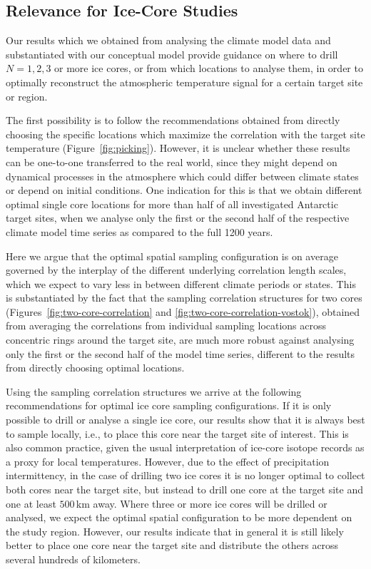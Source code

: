 \documentclass[draft]{agujournal2019}
\begin{document}
\subsection{Relevance for Ice-Core Studies}
\label{discussion:relevance}

Our results which we obtained from analysing the climate model data and
substantiated with our conceptual model provide guidance on where to drill
$N=1, 2, 3$ or more ice cores, or from which locations to analyse them, in order
to optimally reconstruct the atmospheric temperature signal for a certain target
site or region.

The first possibility is to follow the recommendations obtained from directly
choosing the specific locations which maximize the correlation with the target
site temperature (Figure~\ref{fig:picking}). However, it is unclear whether these
results can be one-to-one transferred to the real world, since they might depend
on dynamical processes in the atmosphere which could differ between climate
states or depend on initial conditions. One indication for this is that we
obtain different optimal single core locations for more than half of all
investigated Antarctic target sites, when we analyse only the first or the
second half of the respective climate model time series as compared to the full
1200 years.

Here we argue that the optimal spatial sampling configuration is on average
governed by the interplay of the different underlying correlation length scales,
which we expect to vary less in between different climate periods or states.
This is substantiated by the fact that the sampling correlation structures for
two cores (Figures~\ref{fig:two-core-correlation} and
\ref{fig:two-core-correlation-vostok}), obtained from averaging the correlations
from individual sampling locations  across concentric rings around the target
site, are much more robust against analysing only the first or the second half
of the model time series, different to the results from directly choosing
optimal locations.

Using the sampling correlation structures we arrive at the following
recommendations for optimal ice core sampling configurations. If it is only
possible to drill or analyse a single ice core, our results show that it is
always best to sample locally, i.e., to place this core near the target site of
interest. This is also common practice, given the usual interpretation of
ice-core isotope records as a proxy for local temperatures. However, due to the
effect of precipitation intermittency, in the case of drilling two ice cores it
is no longer optimal to collect both cores near the target site, but instead to
drill one core at the target site and one at least $500$\,km away. Where three
or more ice cores will be drilled or analysed, we expect the optimal spatial
configuration to be more dependent on the study region. However, our results
indicate that in general it is still likely better to place one core near the
target site and distribute the others across several hundreds of kilometers.
\end{document}
